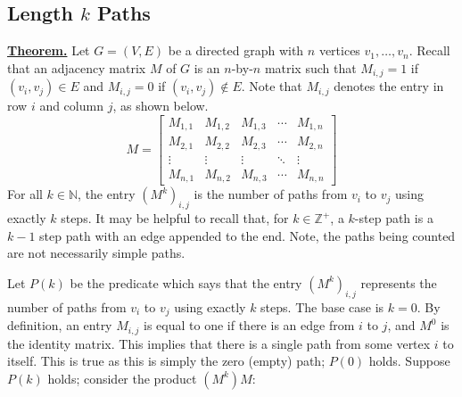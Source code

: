 \documentclass[11pt]{article}
\begin{document}
\subsection{Length \texorpdfstring{$k$}{k} Paths}
\underline{\textbf{Theorem.}} Let $G = (V, E)$ be a directed graph with $n$ vertices $v_1, \dots, v_n$. Recall that an adjacency matrix $M$ of $G$ is an $n$-by-$n$ matrix such that $M_{i, j} = 1$ if $(v_i, v_j) \in E$ and $M_{i, j} = 0$ if $(v_i, v_j) \notin E$. Note that $M_{i, j}$ denotes the entry in row $i$ and column $j$, as shown below.
\begin{equation*}
    M = \begin{bmatrix}
        M_{1, 1} & M_{1, 2} & M_{1, 3} & \cdots & M_{1, n} \\
        M_{2, 1} & M_{2, 2} & M_{2, 3} & \cdots & M_{2, n} \\
        \vdots & \vdots & \vdots & \ddots & \vdots \\
        M_{n, 1} & M_{n, 2} & M_{n, 3} & \cdots & M_{n, n}
    \end{bmatrix}
\end{equation*}
For all $k \in \mathbb{N}$, the entry $(M^k)_{i, j}$ is the number of paths from $v_i$ to $v_j$ using exactly $k$ steps. It may be helpful to recall that, for $k \in \mathbb{Z}^+$, a $k$-step path is a $k-1$ step path with an edge appended to the end. Note, the paths being counted are not necessarily simple paths. 

Let $P(k)$ be the predicate which says that the entry $(M^k)_{i, j}$ represents the number of paths from $v_i$ to $v_j$ using exactly $k$ steps. The base case is $k = 0$. By definition, an entry $M_{i, j}$ is equal to one if there is an edge from $i$ to $j$, and $M^0$ is the identity matrix. This implies that there is a single path from some vertex $i$ to itself. This is true as this is simply the zero (empty) path; $P(0)$ holds. Suppose $P(k)$ holds; consider the product $(M^k)M$:
\end{document}

